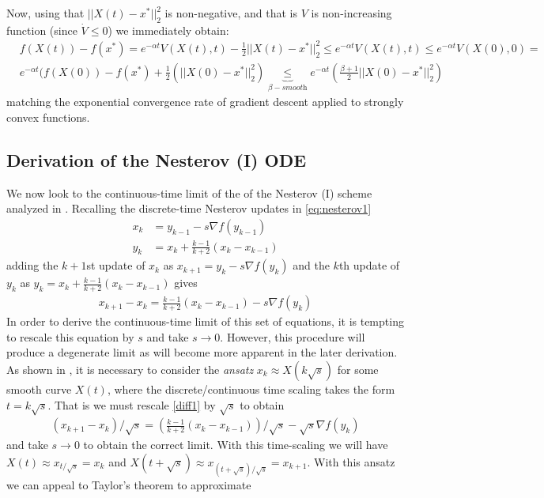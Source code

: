 Now, using that $||X(t)-x^*||_2^2$ is non-negative, and that is $V$ is non-increasing function (since $\dot{V} \leq 0$) we immediately obtain:
\begin{align*}
    & f(X(t)) - f(x^*) = e^{-\alpha t} V(X(t), t) - \frac{1}{2} ||X(t) - x^*||_2^2 \leq e^{-\alpha t} V(X(t), t) \leq e^{-\alpha t} V(X(0), 0) = \\
    & e^{-\alpha t} (f(X(0))-f(x^*)+\frac{1}{2}(||X(0)-x^*||_2^2) \underbrace{\leq}_{\beta-\textit{smooth}} e^{-\alpha t} \left( \frac{\beta+1}{2} ||X(0) - x^*||_2^2 \right) 
\end{align*}
matching the exponential convergence rate of gradient descent applied to strongly convex functions.

\proofend

\subsection{Derivation of the Nesterov (I) ODE}
We now look to the continuous-time limit of the of the Nesterov (I) scheme analyzed in \citep{su2014differential}. Recalling the discrete-time Nesterov updates in \eqref{eq:nesterov1}
\begin{align*}
    x_k &= y_{k-1} - s \nabla f(y_{k-1})\\
    y_k &= x_k + \frac{k-1}{k+2} (x_k - x_{k-1})
\end{align*}
adding the $k+1$st update of $x_k$ as $x_{k+1} = y_k - s \nabla f(y_k)$ and the $k$th update of $y_k$ as $y_k = x_k + \frac{k-1}{k+2}(x_k-x_{k-1})$ gives
\begin{align}
    x_{k+1} - x_{k} = \frac{k-1}{k+2}(x_{k}-x_{k-1}) - s \nabla f(y_k) \label{diff1}
\end{align}
In order to derive the continuous-time limit of this set of equations, it is tempting to rescale this equation by $s$ and take $s \to 0$. However, this procedure will produce a degenerate limit as will become more apparent in the later derivation. As shown in \citet{su2014differential}, it is necessary to consider the \textit{ansatz} $x_k \approx X(k \sqrt{s})$ for some smooth curve $X(t)$, where the discrete/continuous time scaling takes the form $t = k \sqrt{s}$. That is we must rescale \eqref{diff1} by $\sqrt{s}$ to obtain
\begin{align}
    (x_{k+1} - x_{k})/\sqrt{s} = \left(\frac{k-1}{k+2}(x_{k}-x_{k-1}) \right)/\sqrt{s} - \sqrt{s} \nabla f(y_k) \label{diff2}
\end{align}
and take $s \to 0$ to obtain the correct limit. With this time-scaling we will have $X(t) \approx x_{t/\sqrt{s}} = x_k$ and $X(t+ \sqrt{s}) \approx x_{(t+\sqrt{s})/\sqrt{s}} = x_{k+1}$. With this ansatz we can appeal to Taylor's theorem to approximate
